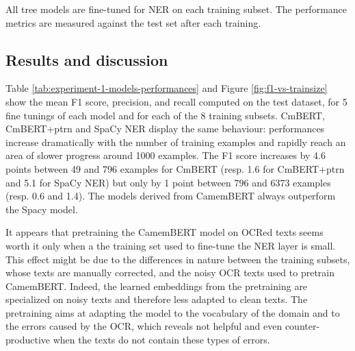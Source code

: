 All tree models are fine-tuned for NER on each training subset.
The performance metrics are measured against the test set after each training.

\subsection{Results and discussion}

Table \ref{tab:experiment-1-models-performances} and Figure \ref{fig:f1-vs-trainsize} show the mean F1 score, precision, and recall computed on the test dataset, for 5 fine tunings of each model and for each of the 8 training subsets.
CmBERT, CmBERT+ptrn and SpaCy NER display the same behaviour: performances increase dramatically with the number of training examples and rapidly reach an area of slower progress around 1000 examples.
The F1 score increases by 4.6 points between 49 and 796 examples for CmBERT (resp. 1.6 for CmBERT+ptrn and 5.1 for SpaCy NER) but only by 1 point between 796 and 6373 examples (resp. 0.6 and 1.4).
The models derived from CamemBERT always outperform the Spacy model.

It appears that pretraining the CamemBERT model on OCRed texts seems worth it only when a the training set used to fine-tune the NER layer is small.
This effect might be due to the differences in nature between the training subsets, whose texts are manually corrected, and the noisy OCR texts used to pretrain CamemBERT.
Indeed, the learned embeddings from the pretraining are specialized on noisy texts and therefore less adapted to clean texts.
The pretraining aims at adapting the model to the vocabulary of the domain and to the errors caused by the OCR, which reveals not helpful and even counter-productive when the texts do not contain these types of errors.


